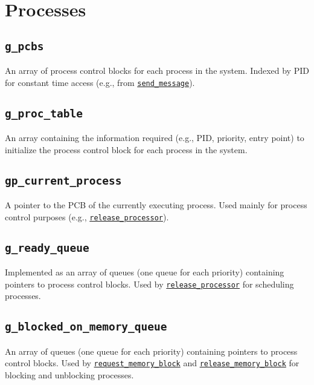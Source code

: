 \documentclass[12pt]{report}
\begin{document}
\section{Processes}

\subsection{\texttt{g_pcbs}}

An array of process control blocks for each process in the system. Indexed by PID for constant time access (e.g., from \hyperref[alg:sendingmessages]{\texttt{send_message}}).

\subsection{\texttt{g_proc_table}}

An array containing the information required (e.g., PID, priority, entry point) to initialize the process control block for each process in the system.

\subsection{\texttt{gp_current_process}}

A pointer to the PCB of the currently executing process. Used mainly for process control purposes (e.g., \hyperref[alg:releasingtheprocessor]{\texttt{release_processor}}).

\subsection{\texttt{g_ready_queue}}

Implemented as an array of queues (one queue for each priority) containing pointers to process control blocks. Used by \hyperref[alg:releasingtheprocessor]{\texttt{release_processor}} for scheduling processes.

\subsection{\texttt{g_blocked_on_memory_queue}}

An array of queues (one queue for each priority) containing pointers to process control blocks. Used by \hyperref[alg:requestingmemoryblocks]{\texttt{request_memory_block}} and \hyperref[alg:releasingmemoryblocks]{\texttt{release_memory_block}} for blocking and unblocking processes.
\end{document}

